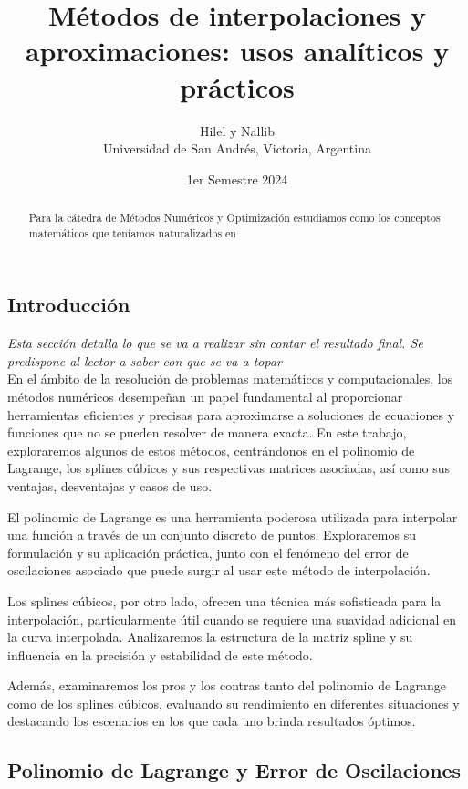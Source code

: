 \documentclass[12pt,a4]{article} %
\title{Métodos de interpolaciones y aproximaciones: \newline usos analíticos y prácticos}
\author{Hilel y Nallib\\ [2mm] %
\small Universidad de San Andrés, Victoria, Argentina}
\date{1er Semestre 2024}
\begin{document}
\maketitle


\begin{abstract}
    Para la cátedra de Métodos Numéricos y Optimización estudiamos como los conceptos matemáticos que teníamos naturalizados en 
\end{abstract}

\begin{multicols}{2}
\raggedcolumns

\section{Introducción}

\textit{Esta sección detalla lo que se va a realizar sin contar el resultado final. Se predispone al lector a saber con que se va a topar}\\

En el ámbito de la resolución de problemas matemáticos y computacionales, los métodos numéricos desempeñan un papel fundamental al proporcionar herramientas eficientes y precisas para aproximarse a soluciones de ecuaciones y funciones que no se pueden resolver de manera exacta. En este trabajo, exploraremos algunos de estos métodos, centrándonos en el polinomio de Lagrange, los splines cúbicos y sus respectivas matrices asociadas, así como sus ventajas, desventajas y casos de uso.

El polinomio de Lagrange es una herramienta poderosa utilizada para interpolar una función a través de un conjunto discreto de puntos. Exploraremos su formulación y su aplicación práctica, junto con el fenómeno del error de oscilaciones asociado que puede surgir al usar este método de interpolación.

Los splines cúbicos, por otro lado, ofrecen una técnica más sofisticada para la interpolación, particularmente útil cuando se requiere una suavidad adicional en la curva interpolada. Analizaremos la estructura de la matriz spline y su influencia en la precisión y estabilidad de este método.

Además, examinaremos los pros y los contras tanto del polinomio de Lagrange como de los splines cúbicos, evaluando su rendimiento en diferentes situaciones y destacando los escenarios en los que cada uno brinda resultados óptimos.

\subsection{Polinomio de Lagrange y Error de Oscilaciones}
 

\end{multicols}
\end{document}
